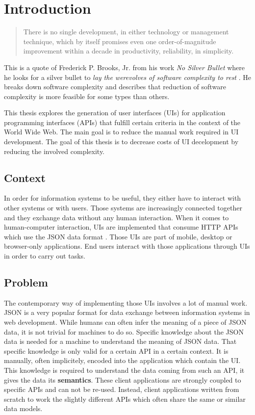 \section{Introduction}\label{introduction}

\begin{quotation}
There is no single development, in either technology or management technique, which by itself promises even one order-of-magnitude improvement within a decade in productivity, reliability, in simplicity.
\end{quotation}

This is a quote of Frederick P. Brooks, Jr. from his work \textit{No Silver Bullet} where he looks for a silver bullet to \textit{lay the werevolves of software complexity to rest} \citep{nosilverbullet}. He breaks down software complexity and describes that reduction of software complexity is more feasible for some types than others.

This thesis explores the generation of user interfaces (UIs) for application programming interfaces (APIs) that fulfill certain criteria in the context of the World Wide Web. The main goal is to reduce the manual work required in UI development. The goal of this thesis is to decrease costs of UI decelopment by reducing the involved complexity.

\subsection{Context}\label{context}
In order for information systems to be useful, they either have to interact with other systems or with users. Those systems are increasingly connected together and they exchange data without any human interaction. When it comes to human-computer interaction, UIs are implemented that consume HTTP APIs which use the JSON data format \citep{jsonformat}. Those UIs are part of mobile, desktop or browser-only applications. End users interact with those applications through UIs in order to carry out tasks.

\subsection{Problem}\label{problem}
The contemporary way of implementing those UIs involves a lot of manual work. JSON is a very popular format for data exchange between information systems in web development. While humans can often infer the meaning of a piece of JSON data, it is not trivial for machines to do so. Specific knowledge about the JSON data is needed for a machine to understand the meaning of JSON data. That specific knowledge is only valid for a certain API in a certain context. It is manually, often implicitely, encoded into the application which contain the UI. This knowledge is required to understand the data coming from such an API, it gives the data its \textbf{semantics}. These client applications are strongly coupled to specific APIs and can not be re-used. Instead, client applications written from scratch to work the slightly different APIs which often share the same or similar data models.

